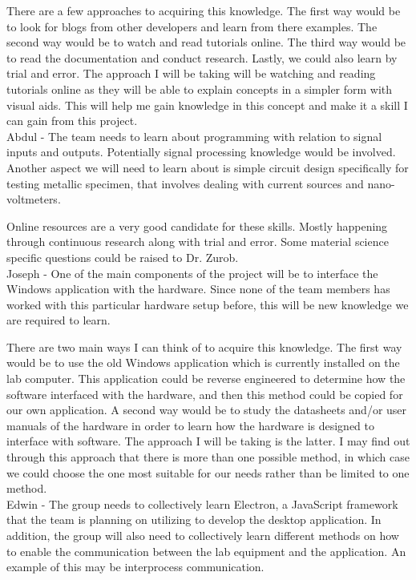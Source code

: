 \documentclass[12pt, titlepage]{article}
\begin{document}
There are a few approaches to acquiring this knowledge. The first way would be to look for blogs from other developers and learn from there
examples. The second way would be to watch and read tutorials online. The third way would be to read the documentation and conduct research. Lastly, 
we could also learn by trial and error. The approach I will be taking will be watching and reading tutorials online as they will be able to explain 
concepts in a simpler form with visual aids. This will help me gain knowledge in this concept and 
make it a skill I can gain from this project.\\

Abdul - The team needs to learn about programming with relation to signal inputs and outputs. Potentially signal processing knowledge would be involved. Another aspect we will need to learn about is simple circuit design specifically for testing metallic specimen, that involves dealing with current sources and nano-voltmeters.

Online resources are a very good candidate for these skills. Mostly happening through continuous research along with trial and error. Some material science specific questions could be raised to Dr. Zurob.\\

Joseph - One of the main components of the project will be to interface the Windows application with the hardware. Since none of the team members has worked with this particular hardware setup before, this will be new knowledge we are required to learn.  

There are two main ways I can think of to acquire this knowledge. The first way would be to use the old Windows application which is currently installed on the lab computer. This application could be reverse engineered to determine how the software interfaced with the hardware, and then this method could be copied for our own application. A second way would be to study the datasheets and/or user manuals of the hardware in order to learn how the hardware is designed to interface with software. The approach I will be taking is the latter. I may find out through this approach that there is more than one possible method, in which case we could choose the one most suitable for our needs rather than be limited to one method.\\ 

Edwin - The group needs to collectively learn Electron, a JavaScript framework that the team is planning on utilizing to develop the desktop application. In addition, the group will also need to collectively learn different methods on how to enable the communication between the lab equipment and the application. An example of this may be interprocess communication.
\end{document}
